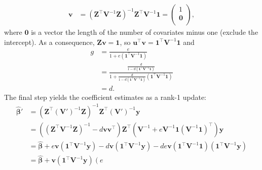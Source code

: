 \documentclass[11pt]{article}
\begin{document}
\begin{appendices}
  \begin{align*}
    \mathbf{v}
    &=
      \left( \mathbf{Z}^\intercal \mathbf{V}^{-1} \mathbf{Z} \right)^{-1} \mathbf{Z}^\intercal \mathbf{V}^{-1} \mathbf{1}
      =
      \begin{pmatrix}
        1 \\
        \mathbf{0} \\
      \end{pmatrix}
      ,
  \end{align*}
  where $\mathbf{0}$ is a vector the length of the number of covariates minus one (exclude the intercept).
  As a consequence, $\mathbf{Z} \mathbf{v} = \mathbf{1}$, so $\mathbf{u}^\intercal \mathbf{v} = \mathbf{1}^\intercal \mathbf{V}^{-1} \mathbf{1}$ and
  \begin{align*}
    g
    &=
      \frac{ e } {1 + e (\mathbf{1}^\intercal \mathbf{V}^{-1} \mathbf{1}) }
    \\
    &=
      \frac{
      \frac{ d }{ 1 - d \left( \mathbf{1}^\intercal \mathbf{V}^{-1} \mathbf{1} \right) }
      } {
      1 + \frac{ d }{ 1 - d \left( \mathbf{1}^\intercal \mathbf{V}^{-1} \mathbf{1} \right) } (\mathbf{1}^\intercal \mathbf{V}^{-1} \mathbf{1})
      }
    \\
    &=
      d
      .
  \end{align*}
  The final step yields the coefficient estimates as a rank-1 update:
  \begin{align*}
    \boldsymbol{\hat{\beta}}'
    &=
      \left( \mathbf{Z}^\intercal \left( \mathbf{V}' \right) ^{-1} \mathbf{Z} \right)^{-1} \mathbf{Z}^\intercal \left( \mathbf{V}' \right)^{-1} \mathbf{y}
    \\
    &=
      \left(   \left( \mathbf{Z}^\intercal \mathbf{V}^{-1} \mathbf{Z} \right)^{-1}
      - d \mathbf{v} \mathbf{v}^\intercal
      \right) \mathbf{Z}^\intercal \left( \mathbf{V}^{-1} + e \mathbf{V}^{-1} \mathbf{1} \left( \mathbf{V}^{-1} \mathbf{1} \right)^\intercal \right) \mathbf{y}
    \\
    &=
      \boldsymbol{\hat{\beta}}
      +
      e \mathbf{v} \left( \mathbf{1}^\intercal \mathbf{V}^{-1} \mathbf{y} \right)
      - d \mathbf{v} \left( \mathbf{1}^\intercal \mathbf{V}^{-1} \mathbf{y} \right)
      - d e \mathbf{v} \left( \mathbf{1}^\intercal \mathbf{V}^{-1} \mathbf{1} \right) \left( \mathbf{1}^\intercal \mathbf{V}^{-1} \mathbf{y} \right)
    \\
    &=
      \boldsymbol{\hat{\beta}}
      + \mathbf{v} \left( \mathbf{1}^\intercal \mathbf{V}^{-1} \mathbf{y} \right) \left(
      e 

\end{align*}
\end{appendices}
\end{document}
